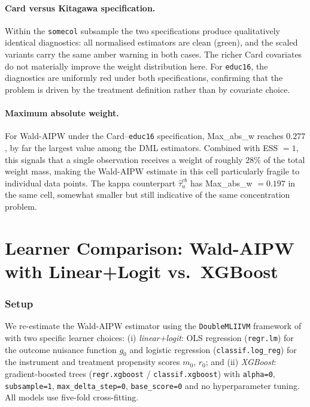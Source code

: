\documentclass[12pt]{article}
\begin{document}
\paragraph{Card versus Kitagawa specification.}
Within the \texttt{somecol} subsample the two
specifications produce qualitatively identical diagnostics:
all normalised estimators are clean (green), and the
scaled variants carry the same amber warning in both
cases. The richer Card covariates do not materially
improve the weight distribution here. For
\texttt{educ16}, the diagnostics are uniformly red
under both specifications, confirming that the problem
is driven by the treatment definition rather than by
covariate choice.

\paragraph{Maximum absolute weight.}
For Wald-AIPW under the Card--\texttt{educ16}
specification, Max\_abs\_w reaches $0.277$, by far the
largest value among the DML estimators. Combined with
ESS $= 1$, this signals that a single observation
receives a weight of roughly $28\%$ of the total weight
mass, making the Wald-AIPW estimate in this cell
particularly fragile to individual data points. The
kappa counterpart $\hat\tau^{cb}_u$ has Max\_abs\_w
$= 0.197$ in the same cell, somewhat smaller but still
indicative of the same concentration problem.




\section*{Learner Comparison: Wald-AIPW with Linear+Logit vs.\ XGBoost}

\subsubsection*{Setup}

We re-estimate the Wald-AIPW estimator using the \texttt{DoubleMLIIVM}
framework of \citet{chernozhukov2018double} with two specific learner choices:
(i) \emph{linear+logit}: OLS regression (\texttt{regr.lm}) for the
outcome nuisance function $g_0$ and logistic regression
(\texttt{classif.log\_reg}) for the instrument and treatment propensity
scores $m_0$, $r_0$; and (ii) \emph{XGBoost}: gradient-boosted trees
(\texttt{regr.xgboost} / \texttt{classif.xgboost}) with
\texttt{alpha=0}, \texttt{subsample=1}, \texttt{max\_delta\_step=0},
\texttt{base\_score=0} and no hyperparameter tuning.
All models use five-fold cross-fitting.
\end{document}
